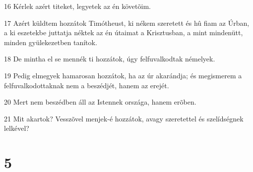 \par 16 Kérlek azért titeket, legyetek az én követõim.
\par 17 Azért küldtem hozzátok Timótheust, ki nékem szeretett és hû fiam az Úrban, a ki eszetekbe juttatja néktek az én útaimat a Krisztusban, a mint mindenütt, minden gyülekezetben tanítok.
\par 18 De mintha el se mennék ti hozzátok, úgy felfuvalkodtak némelyek.
\par 19 Pedig elmegyek hamarosan hozzátok, ha az úr akarándja; és megismerem a felfuvalkodottaknak nem a beszédjét, hanem az erejét.
\par 20 Mert nem beszédben áll az Istennek országa, hanem erõben.
\par 21 Mit akartok? Vesszõvel menjek-é hozzátok, avagy szeretettel és szelídségnek lelkével?

\chapter{5}

